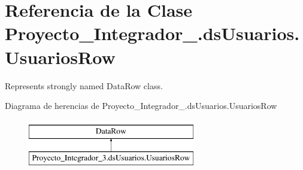 \hypertarget{class_proyecto___integrador__3_1_1ds_usuarios_1_1_usuarios_row}{\section{Referencia de la Clase Proyecto\-\_\-\-Integrador\-\_.\-ds\-Usuarios.\-Usuarios\-Row}
\label{class_proyecto___integrador__3_1_1ds_usuarios_1_1_usuarios_row}
}


Represents strongly named Data\-Row class.  


Diagrama de herencias de Proyecto\-\_\-\-Integrador\-\_.\-ds\-Usuarios.\-Usuarios\-Row\begin{figure}[H]
\begin{center}
\leavevmode
\includegraphics[height=2.000000cm]{class_proyecto___integrador__3_1_1ds_usuarios_1_1_usuarios_row}
\end{center}
\end{figure}
